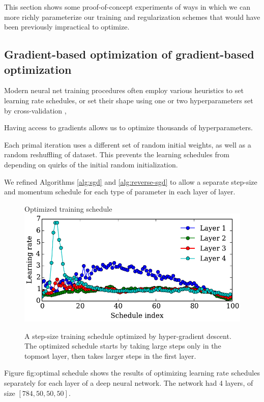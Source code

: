 \documentclass{article}
\begin{document}
This section shows some proof-of-concept experiments of ways in which we can more richly parameterize our training and regularization schemes that would have been previously impractical to optimize.

\subsection{Gradient-based optimization of gradient-based optimization}

Modern neural net training procedures often employ various heuristics to set learning rate schedules, or set their shape using one or two hyperparameters set by cross-validation \citep{dahl2014multi}, \citep{sutskever2013importance}

Having access to gradients allows us to optimize thousands of hyperparameters.

Each primal iteration uses a different set of random initial weights, as well as a random reshuffling of dataset.
This prevents the learning schedules from depending on quirks of the initial random initialization.

We refined Algorithms \ref{alg:sgd} and \ref{alg:reverse-sgd} to allow a separate step-size and momentum schedule for each type of parameter in each layer of layer.
%
\begin{figure}[h!]
\vskip 0.2in
\begin{center}
Optimized training schedule \\
\includegraphics[width=\columnwidth]{../experiments/Feb_3_training_schedules/3_adam_50/schedules_small.pdf}
\caption{A step-size training schedule optimized by hyper-gradient descent.
The optimized schedule starts by taking large steps only in the topmost layer, then takes larger steps in the first layer.}
\label{fig:optimal schedule}
\end{center}
\vskip -0.2in
\end{figure} 
%
Figure {fig:optimal schedule} shows the results of optimizing learning rate schedules separately for each layer of a deep neural network.
The network had 4 layers, of size $[784, 50, 50, 50]$.
\end{document}
